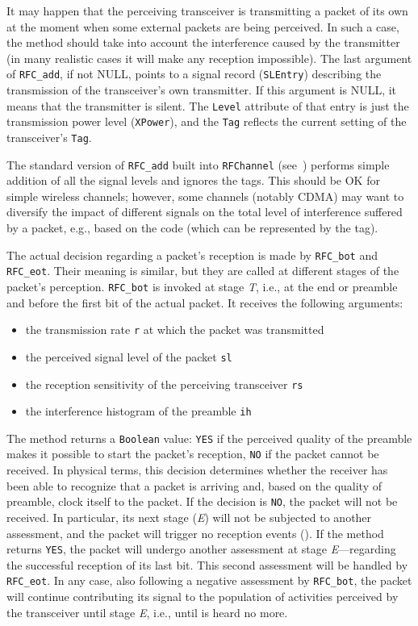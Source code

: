 It may happen that the perceiving transceiver is transmitting a
packet of its own at the moment when some external packets are being perceived.
In such a case, the method should take into account the interference
caused by the transmitter (in many realistic cases it will make any reception
impossible).
The last argument of {\tt RFC\_add}, if not NULL, points to a signal record
({\tt SLEntry}) describing the transmission of the transceiver's own
transmitter.
If this argument is NULL, it means that the transmitter is silent.
The {\tt Level} attribute of that entry is just the transmission power
level ({\tt XPower}), and the {\tt Tag} reflects the current setting of the
transceiver's {\tt Tag}.

The standard version of {\tt RFC\_add} built into {\tt RFChannel}
(see~) performs simple addition of all the signal levels
and ignores the tags.
This should be OK for simple wireless channels; however, some channels
(notably CDMA) may want to diversify the impact of different signals on
the total level of interference suffered by a packet, e.g., based on the
code (which can be represented by the tag).

The actual decision regarding a packet's reception is made by
{\tt RFC\_bot} and {\tt RFC\_eot}.
Their meaning is similar, but they are called at different stages of the
packet's perception.
{\tt RFC\_bot} is invoked at stage {\em T}, i.e., at the end or preamble and
before the first bit of the actual packet.
It receives the following arguments:
\begin{itemize}
\item
the transmission rate {\tt r} at which the packet was transmitted
\item
the perceived signal level of the packet {\tt sl}
\item
the reception sensitivity of the perceiving transceiver {\tt rs}
\item
the interference histogram of the preamble {\tt ih}
\end{itemize}
\noindent
The method returns a {\tt Boolean} value: {\tt YES} if the
perceived quality of the preamble makes it possible to start the packet's
reception, {\tt NO} if the packet cannot be received.
In physical terms, this decision determines whether the receiver has been
able to recognize that a packet is arriving and, based on the quality of
preamble, clock itself to the packet.
If the decision is {\tt NO}, the packet will not be received.
In particular, its next stage ({\em E\/}) will not be subjected to another
assessment, and the packet will trigger no reception events
().
If the method returns {\tt YES}, the packet will undergo another
assessment at stage {\em E\/}---regarding the successful
reception of its last bit.
This second assessment will be handled by {\tt RFC\_eot}.
In any case, also following a negative assessment by {\tt RFC\_bot},
the packet will continue contributing its signal to the population of
activities perceived by the transceiver until stage {\em E}, i.e., until
is heard no more.

